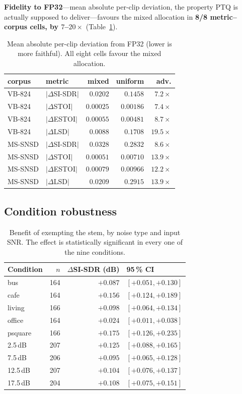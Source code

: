 \documentclass[conference]{IEEEtran}
\begin{document}
\textbf{Fidelity to FP32}---mean absolute per-clip deviation, the property PTQ is actually supposed
to deliver---favours the mixed allocation in \textbf{8/8 metric--corpus cells, by $7$--$20\times$}
(Table~\ref{tab:fidelity}).

\begin{table}[t]
\centering
\caption{Mean absolute per-clip deviation from FP32 (lower is more faithful). All eight cells
favour the mixed allocation.}
\label{tab:fidelity}
\begin{tabular}{llrrr}
\toprule
corpus & metric & mixed & uniform & adv. \\
\midrule
VB-824 & $|\Delta$SI-SDR$|$ & $\mathbf{0.0202}$ & $0.1458$ & $7.2\times$ \\
VB-824 & $|\Delta$STOI$|$ & $\mathbf{0.00025}$ & $0.00186$ & $7.4\times$ \\
VB-824 & $|\Delta$ESTOI$|$ & $\mathbf{0.00055}$ & $0.00481$ & $8.7\times$ \\
VB-824 & $|\Delta$LSD$|$ & $\mathbf{0.0088}$ & $0.1708$ & $19.5\times$ \\
MS-SNSD & $|\Delta$SI-SDR$|$ & $\mathbf{0.0328}$ & $0.2832$ & $8.6\times$ \\
MS-SNSD & $|\Delta$STOI$|$ & $\mathbf{0.00051}$ & $0.00710$ & $13.9\times$ \\
MS-SNSD & $|\Delta$ESTOI$|$ & $\mathbf{0.00079}$ & $0.00966$ & $12.2\times$ \\
MS-SNSD & $|\Delta$LSD$|$ & $\mathbf{0.0209}$ & $0.2915$ & $13.9\times$ \\
\bottomrule
\end{tabular}
\end{table}

\subsection{Condition robustness}
\label{sec:conditions}

\begin{table}[t]
\centering
\caption{Benefit of exempting the stem, by noise type and input SNR. The effect is statistically
significant in every one of the nine conditions.}
\label{tab:conditions}
\begin{tabular}{lrrl}
\toprule
Condition & $n$ & $\Delta$SI-SDR (dB) & 95\,\% CI \\
\midrule
bus & 164 & $+0.087$ & $[+0.051, +0.130]$ \\
cafe & 164 & $+0.156$ & $[+0.124, +0.189]$ \\
living & 166 & $+0.098$ & $[+0.064, +0.134]$ \\
office & 164 & $+0.024$ & $[+0.011, +0.038]$ \\
psquare & 166 & $+0.175$ & $[+0.126, +0.235]$ \\
\midrule
2.5\,dB & 207 & $+0.125$ & $[+0.088, +0.165]$ \\
7.5\,dB & 206 & $+0.095$ & $[+0.065, +0.128]$ \\
12.5\,dB & 207 & $+0.104$ & $[+0.076, +0.137]$ \\
17.5\,dB & 204 & $+0.108$ & $[+0.075, +0.151]$ \\
\bottomrule
\end{tabular}
\end{table}
\end{document}
